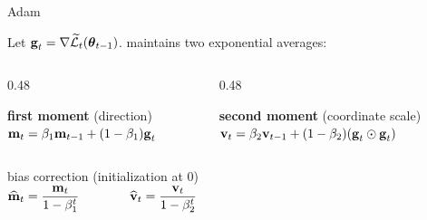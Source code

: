 \documentclass[12pt,aspectratio=169]{beamer}
\begin{document}
\begin{frame}{Adam}

	\small
	Let $\boldsymbol{\mathbf{g}}_t=\nabla\widetilde{\mathcal{L}}_t(\boldsymbol{\mathbf{\theta}}_{t-1})$.
	 maintains two exponential averages:

	\vspace{0.15cm}

	\begin{columns}[T,onlytextwidth]
		\begin{column}{0.48\textwidth}
			\begin{tcolorbox}[
				colback=drawblue_l!35,
				colframe=drawblue,
				boxrule=0.65pt,
				arc=1.5pt,
				left=4pt,
				right=4pt,
				top=3pt,
				bottom=4pt
			]
				\centering
				\textcolor{drawblue}{\textbf{first moment} (direction)}
				\\[0.2em]
				$\displaystyle
				\boldsymbol{\mathbf{m}}_t=
				\beta_1\boldsymbol{\mathbf{m}}_{t-1}+(1-\beta_1)\boldsymbol{\mathbf{g}}_t$
			\end{tcolorbox}
		\end{column}

		\begin{column}{0.48\textwidth}
			\begin{tcolorbox}[
				colback=draworange_l!35,
				colframe=draworange,
				boxrule=0.65pt,
				arc=1.5pt,
				left=4pt,
				right=4pt,
				top=3pt,
				bottom=4pt
			]
				\centering
				\textcolor{draworange}{\textbf{second moment} (coordinate scale)}
				\\[0.2em]
				$\displaystyle
				\boldsymbol{\mathbf{v}}_t=
				\beta_2\boldsymbol{\mathbf{v}}_{t-1}
				+(1-\beta_2)(\boldsymbol{\mathbf{g}}_t\odot\boldsymbol{\mathbf{g}}_t)$
			\end{tcolorbox}
		\end{column}
	\end{columns}

	\vspace{0.08cm}

	\begin{center}
	\begin{tcolorbox}[
		width=0.72\textwidth,
		colback=drawgray_l,
		colframe=drawgray,
		boxrule=0.5pt,
		arc=1.5pt,
		left=4pt,
		right=4pt,
		top=2pt,
		bottom=4pt
	]
		\centering
		{\scriptsize\color{drawgray} bias correction (initialization at 0)}
		\\[0.15em]
		$\displaystyle
		\widehat{\boldsymbol{\mathbf{m}}}_t=\frac{\boldsymbol{\mathbf{m}}_t}{1-\beta_1^t}
		\qquad\qquad
		\widehat{\boldsymbol{\mathbf{v}}}_t=\frac{\boldsymbol{\mathbf{v}}_t}{1-\beta_2^t}$
	\end{tcolorbox}
	\end{center}


\end{frame}
\end{document}

